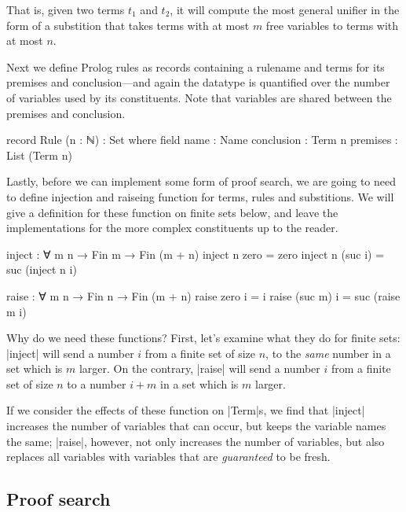 \documentclass[preprint]{sigplanconf}
\begin{document}
That is, given two terms $t_1$ and $t_2$, it will compute the most general
unifier in the form of a substition that takes terms with at most $m$ free
variables to terms with at most $n$.


Next we define Prolog rules as records containing a rulename and terms for its
premises and conclusion---and again the datatype is quantified over the number of
variables used by its constituents. Note that variables are shared between the
premises and conclusion. 

\begin{code}
  record Rule (n : ℕ) : Set where
    field
      name        : Name
      conclusion  : Term n
      premises    : List (Term n)
\end{code}


Lastly, before we can implement some form of proof search, we are going to need
to define injection and raiseing function for terms, rules and substitions.
We will give a definition for these function on finite sets below, and leave the
implementations for the more complex constituents up to the reader.

\begin{code}
  inject : ∀ {m} n → Fin m → Fin (m + n)
  inject n  zero    = zero
  inject n (suc i)  = suc (inject n i)

  raise : ∀ m {n} → Fin n → Fin (m + n)
  raise  zero   i  = i
  raise (suc m) i  = suc (raise m i)
\end{code}

Why do we need these functions? First, let's examine what they do for finite sets:
|inject| will send a number $i$ from a finite set of size $n$, to the \emph{same}
number in a set which is $m$ larger.
On the contrary, |raise| will send a number $i$ from a finite set of size $n$ to a
number $i + m$ in a set which is $m$ larger.

If we consider the effects of these function on |Term|s, we find that |inject|
increases the number of variables that can occur, but keeps the variable names
the same; |raise|, however, not only increases the number of variables, but also
replaces all variables with variables that are \emph{guaranteed} to be fresh.



\subsection{Proof search}
\end{document}
